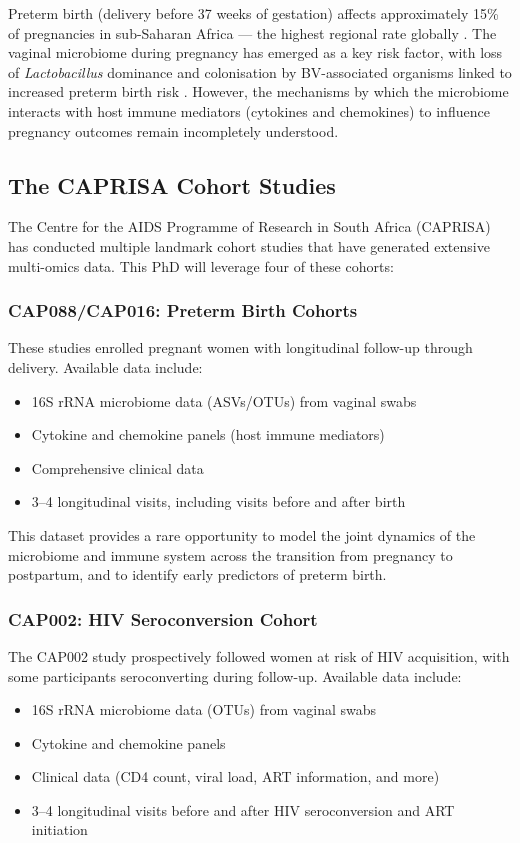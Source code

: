 \documentclass[12pt,a4paper]{report}
\begin{document}
Preterm birth (delivery before 37 weeks of gestation) affects approximately 15\% of pregnancies in sub-Saharan Africa --- the highest regional rate globally \cite{goldenberg2008, who2023}. The vaginal microbiome during pregnancy has emerged as a key risk factor, with loss of \textit{Lactobacillus} dominance and colonisation by BV-associated organisms linked to increased preterm birth risk \cite{florova2021, callahan2017, david2022}. However, the mechanisms by which the microbiome interacts with host immune mediators (cytokines and chemokines) to influence pregnancy outcomes remain incompletely understood.

\subsection{The CAPRISA Cohort Studies}

The Centre for the AIDS Programme of Research in South Africa (CAPRISA) has conducted multiple landmark cohort studies that have generated extensive multi-omics data. This PhD will leverage four of these cohorts:

\subsubsection{CAP088/CAP016: Preterm Birth Cohorts}

These studies enrolled pregnant women with longitudinal follow-up through delivery. Available data include:
\begin{itemize}
    \item 16S rRNA microbiome data (ASVs/OTUs) from vaginal swabs
    \item Cytokine and chemokine panels (host immune mediators)
    \item Comprehensive clinical data
    \item 3--4 longitudinal visits, including visits before and after birth
\end{itemize}

This dataset provides a rare opportunity to model the joint dynamics of the microbiome and immune system across the transition from pregnancy to postpartum, and to identify early predictors of preterm birth.

\subsubsection{CAP002: HIV Seroconversion Cohort}

The CAP002 study prospectively followed women at risk of HIV acquisition, with some participants seroconverting during follow-up. Available data include:
\begin{itemize}
    \item 16S rRNA microbiome data (OTUs) from vaginal swabs
    \item Cytokine and chemokine panels
    \item Clinical data (CD4 count, viral load, ART information, and more)
    \item 3--4 longitudinal visits before and after HIV seroconversion and ART initiation
\end{itemize}
\end{document}
